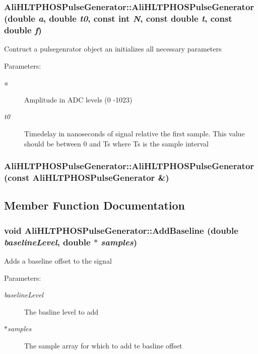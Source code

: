 \subsubsection{\setlength{\rightskip}{0pt plus 5cm}Ali\-HLTPHOSPulse\-Generator::Ali\-HLTPHOSPulse\-Generator (double {\em a}, double {\em t0}, const int {\em N}, const double {\em t}, const double {\em f})}\label{classAliHLTPHOSPulseGenerator_a2}


Contruct a pulsegenrator object an initializes all necessary parameters \begin{Desc}
\item[Parameters:]
\begin{description}
\item[{\em a}]Amplitude in ADC levels (0 -1023) \item[{\em t0}]Timedelay in nanoseconds of signal relative the first sample. This value should be between 0 and Ts where Ts is the sample interval \end{description}
\end{Desc}
\subsubsection{\setlength{\rightskip}{0pt plus 5cm}Ali\-HLTPHOSPulse\-Generator::Ali\-HLTPHOSPulse\-Generator (const {\bf Ali\-HLTPHOSPulse\-Generator} \&)}\label{classAliHLTPHOSPulseGenerator_a3}




\subsection{Member Function Documentation}
\subsubsection{\setlength{\rightskip}{0pt plus 5cm}void Ali\-HLTPHOSPulse\-Generator::Add\-Baseline (double {\em baseline\-Level}, double $\ast$ {\em samples})}\label{classAliHLTPHOSPulseGenerator_a5}


Adds a baseline offset to the signal \begin{Desc}
\item[Parameters:]
\begin{description}
\item[{\em baseline\-Level}]The basline level to add \item[{\em $\ast$samples}]The sample array for which to add te basline offset \end{description}
\end{Desc}
